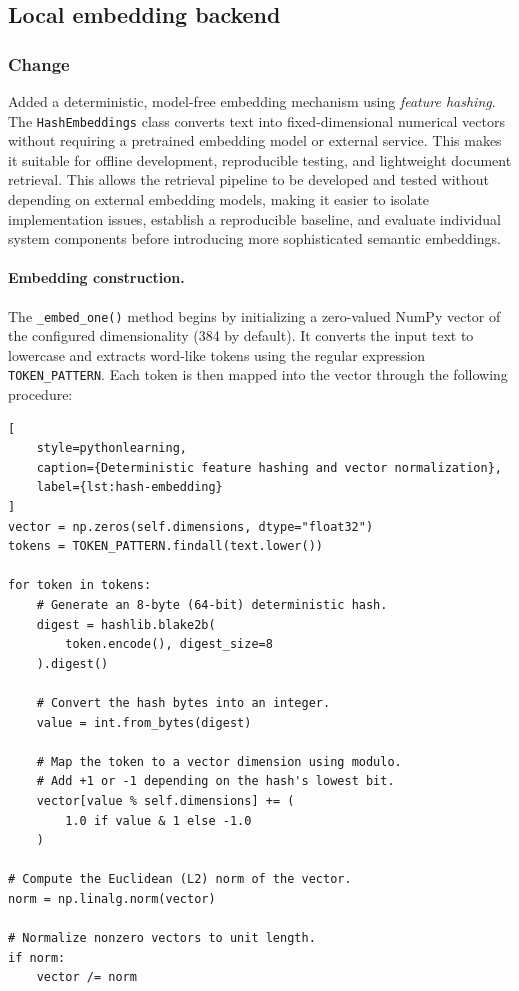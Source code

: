 
\subsection{Local embedding backend}


\subsubsection{Change}

Added a deterministic, model-free embedding mechanism using
\emph{feature hashing}. The \texttt{HashEmbeddings} class converts
text into fixed-dimensional numerical vectors without requiring
a pretrained embedding model or external service. This makes
it suitable for offline development, reproducible testing,
and lightweight document retrieval. This allows the retrieval pipeline to be developed and tested
without depending on external embedding models, making it
easier to isolate implementation issues, establish a reproducible
baseline, and evaluate individual system components before
introducing more sophisticated semantic embeddings.

\paragraph{Embedding construction.}
The \texttt{\_embed\_one()} method begins by initializing a
zero-valued NumPy vector of the configured dimensionality
(384 by default). It converts the input text to lowercase
and extracts word-like tokens using the regular expression
\texttt{TOKEN\_PATTERN}. Each token is then mapped into the
vector through the following procedure:

\begin{lstlisting}[
    style=pythonlearning,
    caption={Deterministic feature hashing and vector normalization},
    label={lst:hash-embedding}
]
vector = np.zeros(self.dimensions, dtype="float32")
tokens = TOKEN_PATTERN.findall(text.lower())

for token in tokens:
    # Generate an 8-byte (64-bit) deterministic hash.
    digest = hashlib.blake2b(
        token.encode(), digest_size=8
    ).digest()

    # Convert the hash bytes into an integer.
    value = int.from_bytes(digest)

    # Map the token to a vector dimension using modulo.
    # Add +1 or -1 depending on the hash's lowest bit.
    vector[value % self.dimensions] += (
        1.0 if value & 1 else -1.0
    )

# Compute the Euclidean (L2) norm of the vector.
norm = np.linalg.norm(vector)

# Normalize nonzero vectors to unit length.
if norm:
    vector /= norm
\end{lstlisting}

